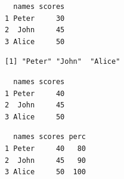 \documentclass[
  letterpaper,
]{scrbook}
\newenvironment{Shaded}{\begin{snugshade}}{\end{snugshade}}
\newcommand{\DecValTok}[1]{\textcolor[rgb]{0.68,0.00,0.00}{#1}}
\newcommand{\NormalTok}[1]{\textcolor[rgb]{0.00,0.23,0.31}{#1}}
\newcommand{\OtherTok}[1]{\textcolor[rgb]{0.00,0.23,0.31}{#1}}
\newcommand{\SpecialCharTok}[1]{\textcolor[rgb]{0.37,0.37,0.37}{#1}}
\begin{document}
\begin{verbatim}
  names scores
1 Peter     30
2  John     45
3 Alice     50
\end{verbatim}

\begin{Shaded}
\end{Shaded}

\begin{verbatim}
[1] "Peter" "John"  "Alice"
\end{verbatim}

\begin{Shaded}
\end{Shaded}

\begin{verbatim}
  names scores
1 Peter     40
2  John     45
3 Alice     50
\end{verbatim}

\begin{Shaded}
\end{Shaded}

\begin{verbatim}
  names scores perc
1 Peter     40   80
2  John     45   90
3 Alice     50  100
\end{verbatim}

\begin{Shaded}
\end{Shaded}
\end{document}
